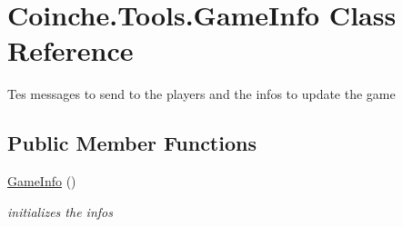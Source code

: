 \hypertarget{class_coinche_1_1_tools_1_1_game_info}{}\section{Coinche.\+Tools.\+Game\+Info Class Reference}
\label{class_coinche_1_1_tools_1_1_game_info}


Tes messages to send to the players and the infos to update the game  


\subsection*{Public Member Functions}
\begin{DoxyCompactItemize}
\item 
\hyperlink{class_coinche_1_1_tools_1_1_game_info_a3c766aced6b335c4888fd5fd06ca098f}{Game\+Info} ()
\begin{DoxyCompactList}\small\item\em initializes the infos \end{DoxyCompactList}\end{DoxyCompactItemize}

